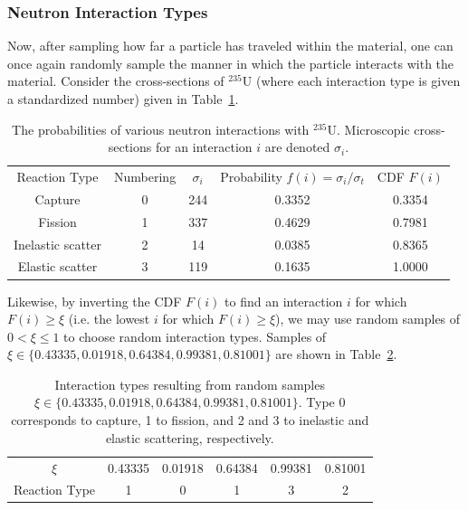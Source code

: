 \documentclass[11pt]{article} %
\begin{document}
\subsubsection{Neutron Interaction Types}
\FloatBarrier
Now, after sampling how far a particle has traveled within the material, one can once again randomly sample the manner in which the particle interacts with the material.
Consider the cross-sections of $^{235}$U (where each interaction type is given a standardized number) given in Table~\ref{tab:u-inters}.
\begin{table}
    \centering
    \caption{The probabilities of various neutron interactions with $^{235}$U. Microscopic cross-sections for an interaction $i$ are denoted $\sigma_i$.}
    \label{tab:u-inters}
    \begin{tabular}{c|cccc}
        Reaction Type & Numbering & $\sigma_i$ & Probability $f(i)=\sigma_i/\sigma_t$ & CDF $F(i)$\\
        Capture & 0 & 244 & 0.3352 & 0.3354 \\
        Fission & 1 & 337 & 0.4629 & 0.7981\\
        Inelastic scatter & 2 & 14 & 0.0385 & 0.8365 \\
        Elastic scatter & 3 & 119 & 0.1635 & 1.0000
    \end{tabular}
\end{table}
Likewise, by inverting the CDF $F(i)$ to find an interaction $i$ for which $F(i)\geq\xi$ (i.e. the lowest $i$ for which $F(i)\geq\xi$), we may use random samples of $0<\xi\leq1$ to choose random interaction types.
Samples of $\xi\in\{0.43335, 0.01918, 0.64384, 0.99381, 0.81001\}$ are shown in Table~\ref{tab:mc-rtype}.\\

\begin{table}
    \centering
    \caption{Interaction types resulting from random samples $\xi\in\{0.43335, 0.01918, 0.64384, 0.99381, 0.81001\}$. Type 0 corresponds to capture, 1 to fission, and 2 and 3 to inelastic and elastic scattering, respectively.}
    \label{tab:mc-rtype}
    \begin{tabular}{c|ccccc}
        $\xi$ & 0.43335 & 0.01918 & 0.64384 & 0.99381 & 0.81001 \\
        Reaction Type & 1 & 0 & 1 & 3 & 2 \\
    \end{tabular}
\end{table}
\end{document}
